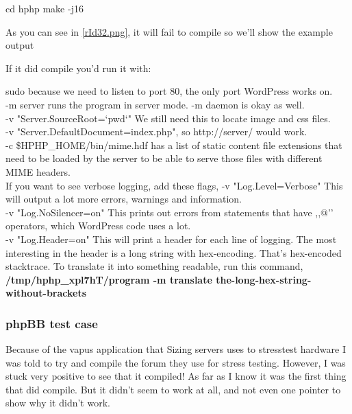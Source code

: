 \begin{enumerate}
\begin{codelisting}
cd hphp
make -j16
\end{codelisting}

As you can see in \autoref{rId32.png}, it will fail to compile so we'll show the example output

If it did compile you'd run it with:
sudo because we need to listen to port 80, the only port WordPress works on.\\
-m server runs the program in server mode. -m daemon is okay as well.\\
-v "Server.SourceRoot=`pwd`" We still need this to locate image and \gls{css} files.\\
-v "Server.DefaultDocument=index.php", so http://server/ would work.\\
-c \$HPHP\_HOME/bin/mime.hdf has a list of static content file extensions that need to be loaded by the server to be able to serve those files with different MIME headers.\\
If you want to see verbose logging, add these flags,
-v "Log.Level=Verbose" This will output a lot more errors, warnings and information.\\
-v "Log.NoSilencer=on" This prints out errors from statements that have ,,@'' operators, which WordPress code uses a lot.\\
-v "Log.Header=on" This will print a header for each line of logging. The most interesting in the header is a long string with hex-encoding. That's hex-encoded stacktrace. To translate it into something readable, run this command,
\textbf{/tmp/hphp\_xpl7hT/program -m translate the-long-hex-string-without-brackets}
\end{enumerate}

\subsubsection{phpBB test case}
Because of the \gls{vapus} application that Sizing servers uses to stresstest hardware I was told to try and compile the forum they use for stress testing. However, I was stuck very positive to see that it compiled!
As far as I know it was the first thing that did compile. But it didn't seem to work at all, and not even one pointer to show why it didn't work.

